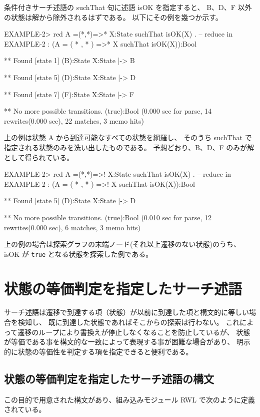 \documentclass{article}
\begin{document}
条件付きサーチ述語の suchThat 句に述語 isOK を指定すると、
B、D、F 以外の状態は解から除外されるはずである。
以下にその例を幾つか示す。
\begin{simplev}
EXAMPLE-2> red A =(*,*)=>* X:State suchThat isOK(X) .
-- reduce in EXAMPLE-2 : (A = ( * , * ) =>* X suchThat isOK(X)):Bool

** Found [state 1] (B):State
   { X:State |-> B }

** Found [state 5] (D):State
   { X:State |-> D }

** Found [state 7] (F):State
   { X:State |-> F }

** No more possible transitions.
(true):Bool
(0.000 sec for parse, 14 rewrites(0.000 sec), 22 matches, 3 memo hits)
\end{simplev}
上の例は状態 A から到達可能なすべての状態を網羅し、
そのうち suchThat で指定される状態のみを洗い出したものである。
予想どおり、B、D、F のみが解として得られている。

\begin{simplev}
EXAMPLE-2> red A =(*,*)=>! X:State suchThat isOK(X) .
-- reduce in EXAMPLE-2 : (A = ( * , * ) =>! X suchThat isOK(X)):Bool

** Found [state 5] (D):State
   { X:State |-> D }

** No more possible transitions.
(true):Bool
(0.010 sec for parse, 12 rewrites(0.000 sec), 6 matches, 3 memo hits)
\end{simplev}
上の例の場合は探索グラフの末端ノード(それ以上遷移のない状態)のうち、
isOK が \texttt{true} となる状態を探索した例である。

\section{状態の等価判定を指定したサーチ述語}
\label{sec:state-eq}

サーチ述語は遷移で到達する項（状態）が以前に到達した項と構文的に等しい場合を検知し、
既に到達した状態であればそこからの探索は行わない。
これによって遷移のループにより書換えが停止しなくなることを防止しているが、
状態が等価である事を構文的な一致によって表現する事が困難な場合があり、
明示的に状態の等価性を判定する項を指定できると便利である。

\subsection{状態の等価判定を指定したサーチ述語の構文}
この目的で用意された構文があり、組み込みモジュール RWL で次のように定義されている。
\end{document}
